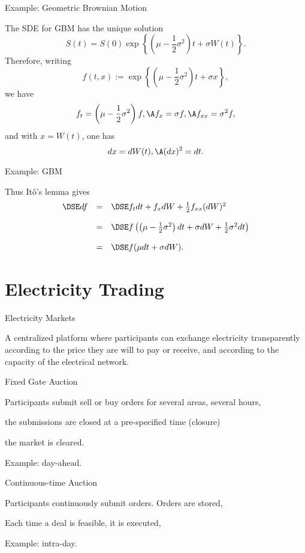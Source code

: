 { Example: Geometric Brownian Motion}

The SDE for GBM has the unique
solution
$$
S(t) = S(0) \exp \left\{\left(\mu - \frac{1}{2}\sigma^2\right)t +
\sigma W(t) \right\}\!.
$$
Therefore, writing
$$
f(t,x) := \exp\left\{\left(\mu - \frac{1}{2}\sigma^2\right)t +
\sigma x \right\}\!,
$$
we have
$$
f_t = \left(\mu - \frac{1}{2}\sigma^2\right)f, \A f_x = \sigma f,
\A f_{xx} = \sigma^2 f,
$$
and with $x = W(t)$, one has
$$
dx = dW(t), \A (dx)^2 = dt.
$$

{ Example: GBM}

Thus It\^{o}'s lemma gives
$$
\begin{array}{lll}
\DSE df &=&\DSE f_t dt + f_x dW + \frac{1}{2} f_{xx}
(dW)^2\\*[12pt] &=&\DSE f\left(\left(\mu -
\frac{1}{2}{\sigma}^2\right) dt + \sigma dW +
\frac{1}{2}{\sigma}^2 dt\right)\\*[12pt] &=&\DSE f(\mu dt + \sigma dW).
\end{array}
$$

\section{Electricity Trading}

{Electricity Markets}

A centralized platform where participants can exchange electricity transparently
according to the price they are will to pay or receive, and according to the capacity of
the electrical network.


	Fixed Gate Auction


	Participants submit sell or buy orders for several areas, several hours,

	the submissions are closed at a pre-specified time (closure)

	the market is cleared.

	Example: day-ahead.


	Continuous-time Auction


	Participants continuously submit orders. Orders are stored,

	Each time a deal is feasible, it is executed,

	Example: intra-day.


